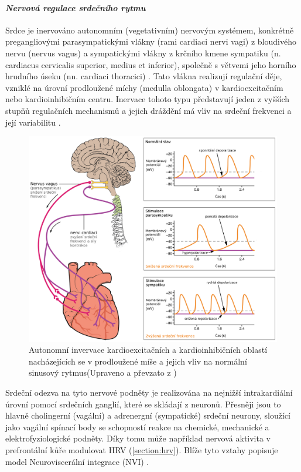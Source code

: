 \paragraph*{\textit{Nervová regulace srdečního rytmu}\\} Srdce je inervováno
autonomním (vegetativním) nervovým systémem, konkrétně pregangliovými
parasympatickými vlákny (rami cardiaci nervi vagi) z bloudivého nervu (nervus
vagus) a sympatickými vlákny z krčního kmene sympatiku (n. cardiacus cervicalis
superior, medius et inferior), společně s větvemi jeho horního hrudního úseku
(nn. cardiaci thoracici) \cite{Dylevsky2013,Kittnar2020}. Tato vlákna realizují
regulační děje, vzniklé na úrovní prodloužené míchy (medulla oblongata) v
kardioexcitačním nebo kardioinhibičním centru. Inervace tohoto typu představují
jeden z vyšších stupňů regulačních mechanismů a jejich dráždění má vliv na
srdeční frekvenci a její variabilitu \cite{Dylevsky2013,Trojan2002}.

\begin{figure}[h]
	\begin{center}
		\includegraphics[width=1\textwidth]{../assets/anatomy/hr_regulation}
		\caption{Autonomní invervace kardioexcitačních a kardioinhibičních
			oblastí nacházejících se v prodloužené míše a jejich vliv na
			normální sinusový rytmus(Upraveno a převzato z \cite{OpenStax})}
		\label{fig:hr_regulation}
	\end{center}
\end{figure}

Srdeční odezva na tyto nervové podněty je realizována na nejnižší intrakardiální
úrovní pomocí srdečních ganglií, které se skládají z neuronů. Přesněji jsou to
hlavně cholingerní (vagální) a adrenergní (sympatické) srdeční neurony, sloužící
jako vagální spínací body se schopností reakce na chemické, mechanické a
elektrofyziologické podněty. Díky tomu může například nervová aktivita v
prefrontální kůře modulovat HRV (\ref{section:hrv}). Blíže tyto vztahy popisuje
model Neuroviscerální integrace (NVI) \cite{Smith2017}.

